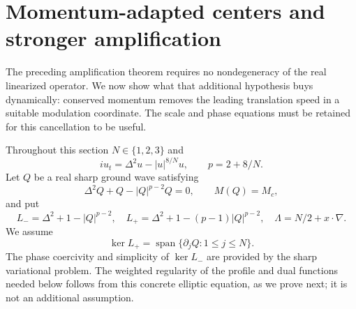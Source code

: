 \section{Momentum-adapted centers and stronger amplification}
\label{sec:r13-center}

The preceding amplification theorem requires no nondegeneracy of the
real linearized operator. We now show what that additional hypothesis
buys dynamically: conserved momentum removes the leading translation
speed in a suitable modulation coordinate. The scale and phase
equations must be retained for this cancellation to be useful.

Throughout this section $N\in\{1,2,3\}$ and
\[
 iu_t=\Delta^2u-|u|^{8/N}u,\qquad p=2+8/N.
\]
Let $Q$ be a real sharp ground wave satisfying
\[
 \Delta^2Q+Q-|Q|^{p-2}Q=0,\qquad M(Q)=M_c,
\]
and put
\[
 L_-=\Delta^2+1-|Q|^{p-2},\quad
 L_+=\Delta^2+1-(p-1)|Q|^{p-2},\quad
 \Lambda=N/2+x\cdot\nabla.
\]
We assume
\begin{equation}\label{eq:r13-real-nondeg}
 \ker L_+=\operatorname{span}\{\partial_jQ:1\le j\le N\}.
\end{equation}
The phase coercivity and simplicity of $\ker L_-$ are provided by the
sharp variational problem. The weighted regularity of the profile and
dual functions needed below follows from this concrete elliptic
equation, as we prove next; it is not an additional assumption.

